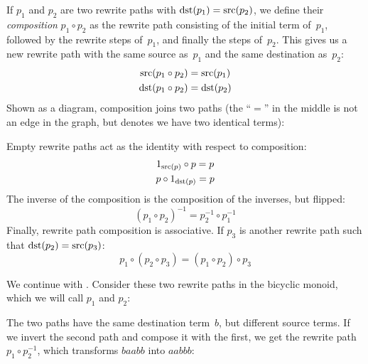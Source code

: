 \documentclass[../generics]{subfiles}
\begin{document}
\begin{definition}
%
If $p_1$ and $p_2$ are two rewrite paths with $\operatorname{dst}(p_1)=\operatorname{src}(p_2)$, we define their \emph{composition} \index{$\circ$}$p_1 \circ p_2$ as the rewrite path consisting of the initial term of~$p_1$, followed by the rewrite steps of~$p_1$, and finally the steps of~$p_2$. This gives us a new rewrite path with the same source as~$p_1$ and the same destination as~$p_2$:
\begin{gather*}
\operatorname{src}(p_1 \circ p_2) = \operatorname{src}(p_1)\\
\operatorname{dst}(p_1 \circ p_2) = \operatorname{dst}(p_2)
\end{gather*}
Shown as a diagram, composition joins two paths (the ``$=$'' in the middle is not an edge in the graph, but denotes we have two identical terms):
\begin{center}
\end{center}
Empty rewrite paths act as the identity with respect to composition:
\begin{gather*}
1_{\operatorname{src}(p)}\circ p = p\\
p\circ 1_{\operatorname{dst}(p)} = p
\end{gather*}
The inverse of the composition is the composition of the inverses, but flipped:
\[(p_1 \circ p_2)^{-1} = p_2^{-1} \circ p_1^{-1}\]
Finally, rewrite path composition is associative. If $p_3$ is another rewrite path such that $\operatorname{dst}(p_2)=\operatorname{src}(p_3)$:
\[p_1 \circ (p_2 \circ p_3) = (p_1 \circ p_2) \circ p_3\]
\end{definition}

\begin{example}\label{bicyclic 4}
We continue with . Consider these two rewrite paths in the bicyclic monoid, which we will call $p_1$ and $p_2$:
\begin{center}
\end{center}
The two paths have the same destination term~$b$, but different source terms. If we invert the second path and compose it with the first, we get the rewrite path $p_1 \circ p_2^{-1}$, which transforms $baabb$ into $aabbb$:
\begin{center}
\end{center}
\end{example}
\end{document}

